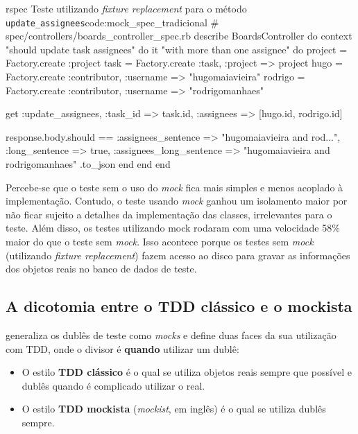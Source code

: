 \begin{mycode}{rspec}%
{Teste utilizando \textit{fixture replacement} para o método \texttt{update\_assignees}}{code:mock_spec_tradicional}
# spec/controllers/boards_controller_spec.rb
describe BoardsController do
  context "should update task assignees" do
    it "with more than one assignee" do
      project = Factory.create :project
      task = Factory.create :task, :project => project
      hugo = Factory.create :contributor, :username => "hugomaiavieira"
      rodrigo = Factory.create :contributor, :username => "rodrigomanhaes"

      get :update_assignees, :task_id => task.id, :assignees => [hugo.id, rodrigo.id]

      response.body.should ==
        { :assignees_sentence => "hugomaiavieira and rod...",
          :long_sentence => true,
          :assignees_long_sentence => "hugomaiavieira and rodrigomanhaes" }.to_json
    end
  end
end
\end{mycode}

Percebe-se que o teste sem o uso do \textit{mock} fica mais simples e menos acoplado à implementação. Contudo, o teste usando \textit{mock} ganhou um isolamento maior por não ficar sujeito a detalhes da implementação das classes, irrelevantes para o teste. Além disso, os testes utilizando mock rodaram com uma velocidade 58\% maior do que o teste sem \textit{mock}. Isso acontece porque os testes sem \textit{mock} (utilizando \textit{fixture replacement}) fazem acesso ao disco para gravar as informações dos objetos reais no banco de dados de teste.


\subsection{A dicotomia entre o TDD clássico e o mockista}
\label{sub:tdd_classico_e_mockista}

 generaliza os dublês de teste como \textit{mocks} e define duas faces da sua utilização com TDD, onde o divisor é \textbf{quando} utilizar um dublê:

\begin{itemize}
  \item O estilo \textbf{TDD clássico} é o qual se utiliza objetos reais sempre que possível e dublês quando é complicado utilizar o real.

  \item O estilo \textbf{TDD mockista} (\textit{mockist}, em inglês) é o qual se utiliza dublês sempre.
\end{itemize}

